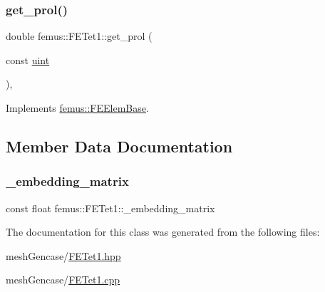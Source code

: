 \mbox{\label{classfemus_1_1_f_e_tet1_aa0de96383fcaaaa22f35ea9a2780d660}} 
\subsubsection{\texorpdfstring{get\+\_\+prol()}{get\_prol()}}
{\footnotesize\ttfamily double femus\+::\+F\+E\+Tet1\+::get\+\_\+prol (\begin{DoxyParamCaption}\item[{const \mbox{\hyperlink{_typedefs_8hpp_a91ad9478d81a7aaf2593e8d9c3d06a14}{uint}}}]{ }\end{DoxyParamCaption})\hspace{0.3cm}{\ttfamily [inline]}, {\ttfamily [virtual]}}



Implements \mbox{\hyperlink{classfemus_1_1_f_e_elem_base_ac82326cdc7cb02329c7be9547d56fad4}{femus\+::\+F\+E\+Elem\+Base}}.



\subsection{Member Data Documentation}
\mbox{\label{classfemus_1_1_f_e_tet1_a9c40788260ae985692adb8242830273a}} 
\subsubsection{\texorpdfstring{\+\_\+embedding\+\_\+matrix}{\_embedding\_matrix}}
{\footnotesize\ttfamily const float femus\+::\+F\+E\+Tet1\+::\+\_\+embedding\+\_\+matrix\hspace{0.3cm}{\ttfamily [static]}}



The documentation for this class was generated from the following files\+:\begin{DoxyCompactItemize}
\item 
mesh\+Gencase/\mbox{\hyperlink{_f_e_tet1_8hpp}{F\+E\+Tet1.\+hpp}}\item 
mesh\+Gencase/\mbox{\hyperlink{_f_e_tet1_8cpp}{F\+E\+Tet1.\+cpp}}\end{DoxyCompactItemize}
